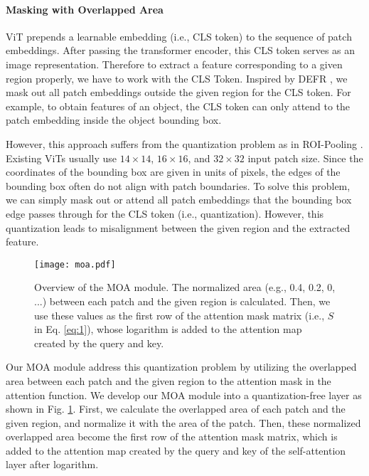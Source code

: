 \documentclass[10pt,twocolumn,letterpaper]{article}
\begin{document}
\paragraph{Masking with Overlapped Area}
ViT prepends a learnable embedding (i.e., CLS token) to the sequence of patch embeddings. After passing the transformer encoder, this CLS token serves as an image representation. Therefore to extract a feature corresponding to a given region properly, we have to work with the CLS Token. Inspired by DEFR \cite{jin2022overlooked}, we mask out all patch embeddings outside the given region for the CLS token. For example, to obtain features of an object, the CLS token can only attend to the patch embedding inside the object bounding box. 

However, this approach suffers from the quantization problem as in ROI-Pooling \cite{he2017mask}. Existing ViTs usually use $14 \times 14$, $16 \times 16$, and $32 \times 32$ input patch size. Since the coordinates of the bounding box are given in units of pixels, the edges of the bounding box often do not align with patch boundaries. To solve this problem, we can simply mask out or attend all patch embeddings that the bounding box edge passes through for the CLS token (i.e., quantization). However, this quantization leads to misalignment between the given region and the extracted feature.

\begin{figure}[t]
\begin{center}

\texttt{[image: moa.pdf]}

\end{center}
\vspace{-5mm}
   \caption{Overview of the MOA module. The normalized area (e.g., 0.4, 0.2, 0, ...) between each patch and the given region is calculated. Then, we use these values as the first row of the attention mask matrix (i.e., $S$ in Eq. \ref{eq:1}), whose logarithm is added to the attention map created by the query and key.
}
\vspace{-1mm}
\label{fig:moa}
\end{figure} 

Our MOA module address this quantization problem by utilizing the overlapped area between each patch and the given region to the attention mask in the attention function. We develop our MOA module into a quantization-free layer as shown in Fig. \ref{fig:moa}. First, we calculate the overlapped area of each patch and the given region, and normalize it with the area of the patch. Then, these normalized overlapped area become the first row of the attention mask matrix, which is added to the attention map created by the query and key of the self-attention layer after logarithm.
\end{document}
